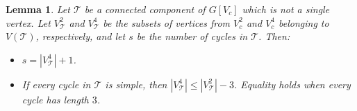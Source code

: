 \documentclass[10pt,a4paper]{amsart}
\newtheorem{lemma}{Lemma}
\begin{document}
        \begin{lemma}\label{lem:count_c}
            Let $\mathcal{T}$ be a connected component of $G[V_c]$ which is not a single vertex.
            Let $V^2_{\mathcal{T}}$ and $V^4_{\mathcal{T}}$ be the subsets of vertices from $V^2_{c}$ and $V^4_{c}$ belonging to $V(\mathcal{T})$, respectively, and let $s$ be the number of cycles in $\mathcal{T}$.
            Then:
            \begin{itemize}
                \item[(i)]  $s=|V^4_{\mathcal{T}}|+1$.
                \item[(ii)] If every cycle in $\mathcal{T}$ is simple, then $|V^4_{\mathcal{T}}|\leq |V^2_{\mathcal{T}}|-3$.
                Equality holds when every cycle has length $3$.
            \end{itemize}
        \end{lemma}
\end{document}
